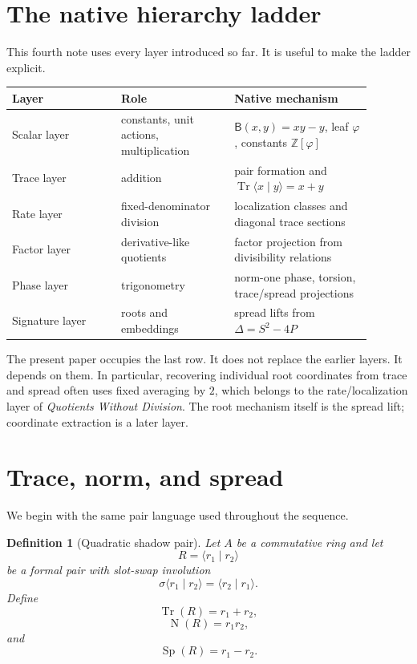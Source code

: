\documentclass[11pt]{article}
\newtheorem{definition}{Definition}[section]
\newcommand{\B}{\mathsf{B}}
\newcommand{\Tr}{\operatorname{Tr}}
\newcommand{\Nm}{\operatorname{N}}
\newcommand{\Sp}{\operatorname{Sp}}
\newcommand{\sig}{\sigma}
\newcommand{\ph}{\varphi}
\newcommand{\Z}{\mathbb{Z}}
\begin{document}
\section{The native hierarchy ladder}

This fourth note uses every layer introduced so far.  It is useful to make the ladder explicit.

\begin{center}
\begin{tabular}{p{0.27\linewidth}p{0.28\linewidth}p{0.34\linewidth}}
\toprule
Layer & Role & Native mechanism \\
\midrule
Scalar layer & constants, unit actions, multiplication & $\B(x,y)=xy-y$, leaf $\ph$, constants $\Z[\ph]$ \\
Trace layer & addition & pair formation and $\Tr\langle x\mid y\rangle=x+y$ \\
Rate layer & fixed-denominator division & localization classes and diagonal trace sections \\
Factor layer & derivative-like quotients & factor projection from divisibility relations \\
Phase layer & trigonometry & norm-one phase, torsion, trace/spread projections \\
Signature layer & roots and embeddings & spread lifts from $\Delta=S^2-4P$ \\
\bottomrule
\end{tabular}
\end{center}

The present paper occupies the last row.  It does not replace the earlier layers.  It depends on them.  In particular, recovering individual root coordinates from trace and spread often uses fixed averaging by $2$, which belongs to the rate/localization layer of \emph{Quotients Without Division}.  The root mechanism itself is the spread lift; coordinate extraction is a later layer.

\section{Trace, norm, and spread}

We begin with the same pair language used throughout the sequence.

\begin{definition}[Quadratic shadow pair]
Let $A$ be a commutative ring and let
\[
    R=\langle r_1\mid r_2\rangle
\]
be a formal pair with slot-swap involution
\[
    \sig\langle r_1\mid r_2\rangle=\langle r_2\mid r_1\rangle.
\]
Define
\[
    \Tr(R)=r_1+r_2,
\]
\[
    \Nm(R)=r_1r_2,
\]
and
\[
    \Sp(R)=r_1-r_2.
\]
\end{definition}
\end{document}
